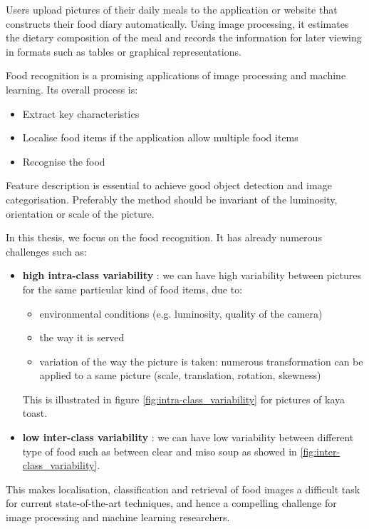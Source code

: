 Users upload pictures of their daily meals to the application or website that constructs their food diary automatically. Using image processing, it estimates the dietary composition of the meal and records the information for later viewing in formats such as tables or graphical representations.

Food recognition is a promising applications of image processing and machine learning. Its overall process is:
\begin{itemize}
    \item Extract key characteristics
    \item Localise food items if the application allow multiple food items
    \item Recognise the food
\end{itemize}
Feature description is essential to achieve good object detection and image categorisation. Preferably the method should be invariant of the luminosity, orientation or scale of the picture.

In this thesis, we focus on the food recognition. It has already numerous challenges such as:
\begin{itemize}
    \item \textbf{high intra-class variability} : we can have high variability between pictures for the same particular kind of food items, due to:
    \begin{itemize}
        \item environmental conditions (e.g. luminosity, quality of the camera)
        \item the way it is served
        \item variation of the way the picture is taken: numerous transformation can be applied to a same picture (scale, translation, rotation, skewness)
    \end{itemize}
    This is illustrated in figure \ref{fig:intra-class_variability} for pictures of kaya toast.
    
    \item \textbf{low inter-class variability} : we can have low variability between different type of food such as between clear and miso soup as showed in \ref{fig:inter-class_variability}.
\end{itemize}

This makes localisation, classification and retrieval of food images a difficult task for current state-of-the-art techniques, and hence a compelling challenge for image processing and machine learning researchers.

